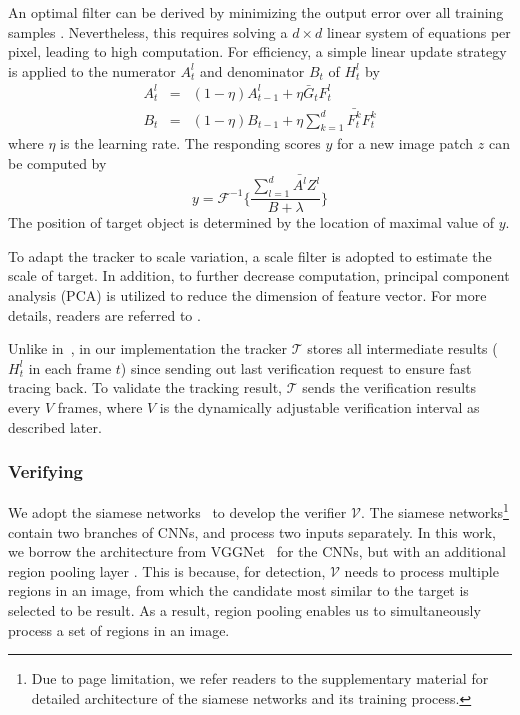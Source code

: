 \documentclass[10pt,twocolumn,letterpaper]{article}
\def \TK{\mathcal{T}}
\def \VF{\mathcal{V}}
\begin{document}
An optimal filter can be derived by minimizing the output error over all training samples \cite{kiani2013multi}. Nevertheless, this requires solving a $d\times{d}$ linear system of equations per pixel, leading to high computation. For efficiency, a simple linear update strategy is applied to the numerator $A_{t}^{l}$ and denominator $B_{t}$ of $H_{t}^{l}$ by
\begin{equation}
\begin{array}{lcl}
    A_{t}^{l} & = & (1-\eta)A_{t-1}^{l} + \eta{\bar{G}_{t}F_{t}^{l}} \\
    B_{t}     & = & (1-\eta)B_{t-1} + \eta\sum\nolimits_{k=1}^{d}{\bar{F_{t}^{k}}F_{t}^{k}}  \label{eq3}
\end{array}
\end{equation}
where $\eta$ is the learning rate. The responding scores $y$ for a new image patch $z$ can be computed by
\begin{equation}
y=\mathcal{F}^{-1}	\bigg\{ \frac{\sum_{l=1}^{d}{\bar{A^{l}}Z^{l}}}{B+\lambda} \bigg\}
\end{equation}
The position of target object is determined by the location of maximal value of $y$.

To adapt the tracker to scale variation, a scale filter is adopted to estimate the scale of target. In addition, to further decrease computation, principal component analysis (PCA) is utilized to reduce the dimension of feature vector. For more details, readers are referred to \cite{danelljan2016discriminative}.

Unlike in~\cite{danelljan2016discriminative}, in our implementation the tracker $\TK$ stores all intermediate results (\eg $H_{t}^{l}$ in each frame $t$) since sending out last verification request to ensure fast tracing back.  To validate the tracking result, $\TK$ sends the verification results every $V$ frames, where $V$ is the dynamically adjustable verification interval as described later.

\subsubsection{Verifying}
We adopt the siamese networks~\cite{chopra2005learning} to develop the verifier $\VF$. The siamese networks\footnote{Due to page limitation, we refer readers to the supplementary material for detailed architecture of the siamese networks and its training process.} contain two branches of CNNs, and process two inputs separately. In this work, we borrow the architecture from VGGNet~\cite{simonyan2014very} for the CNNs, but with an additional region pooling layer \cite{girshick2015fast}. This is because, for detection, $\VF$ needs to process multiple regions in an image, from which the candidate most similar to the target is selected to be result. As a result, region pooling enables us to simultaneously process a set of regions in an image.
\end{document}

